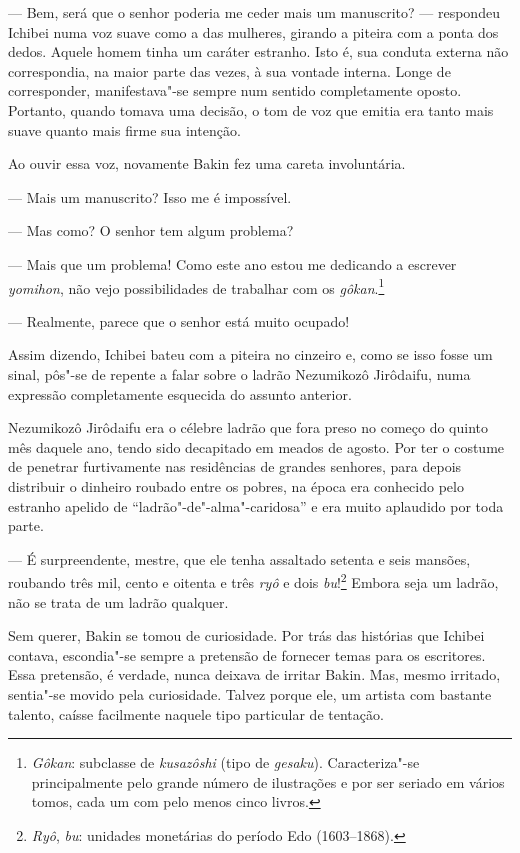 --- Bem, será que o senhor poderia me ceder mais um manuscrito? ---
respondeu Ichibei numa voz suave como a das mulheres, girando a piteira
com a ponta dos dedos. Aquele homem tinha um caráter estranho. Isto é,
sua conduta externa não correspondia, na maior parte das vezes, à sua
vontade interna. Longe de corresponder, manifestava"-se sempre num
sentido completamente oposto. Portanto, quando tomava uma decisão, o
tom de voz que emitia era tanto mais suave quanto mais firme sua
intenção.

Ao ouvir essa voz, novamente Bakin fez uma careta involuntária.

--- Mais um manuscrito? Isso me é impossível.

--- Mas como? O senhor tem algum problema?

--- Mais que um problema! Como este ano estou me dedicando a escrever 
\textit{yomihon}, não vejo possibilidades de trabalhar com os
\textit{gôkan}.\footnote{ \textit{Gôkan}: subclasse de
\textit{kusazôshi} (tipo de \textit{gesaku}). Caracteriza"-se
principalmente pelo grande número de ilustrações e por ser seriado em
vários tomos, cada um com pelo menos cinco livros.}

--- Realmente, parece que o senhor está muito ocupado!

Assim dizendo, Ichibei bateu com a piteira no cinzeiro e, como se isso
fosse um sinal, pôs"-se de repente a falar sobre o ladrão Nezumikozô
Jirôdaifu, numa expressão completamente esquecida do assunto anterior.

\sectionitem
Nezumikozô Jirôdaifu era o célebre ladrão que fora preso no começo do
quinto mês daquele ano, tendo sido decapitado em meados de agosto. Por
ter o costume de penetrar furtivamente nas residências de grandes
senhores, para depois distribuir o dinheiro roubado entre os pobres, na
época era conhecido pelo estranho apelido de ``ladrão"-de"-alma"-caridosa''
e era muito aplaudido por toda parte.

--- É surpreendente, mestre, que ele tenha assaltado setenta e seis
mansões, roubando três mil, cento e oitenta e três \textit{ryô} e dois
\textit{bu}!\footnote{ \textit{Ryô}, \textit{bu}: unidades monetárias do
período Edo (1603--1868).} Embora seja um ladrão, não se trata de
um ladrão qualquer.

Sem querer, Bakin se tomou de curiosidade. Por trás das histórias que
Ichibei contava, escondia"-se sempre a pretensão de fornecer temas para
os escritores. Essa pretensão, é verdade, nunca deixava de irritar
Bakin. Mas, mesmo irritado, sentia"-se movido pela curiosidade. Talvez
porque ele, um artista com bastante talento, caísse facilmente naquele
tipo particular de tentação.


